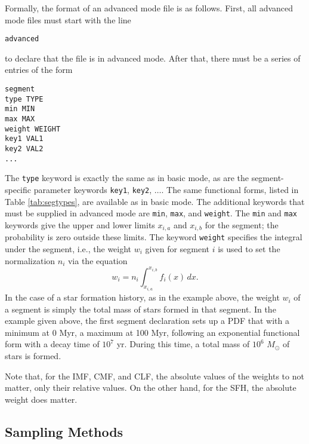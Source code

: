 \documentclass[12pt]{article}
\begin{document}
Formally, the format of an advanced mode file is as follows. First, all advanced mode files must start with the line
\begin{verbatim}
advanced
\end{verbatim}
to declare that the file is in advanced mode. After that, there must be a series of entries of the form
\begin{verbatim}
segment
type TYPE
min MIN
max MAX
weight WEIGHT
key1 VAL1
key2 VAL2
...
\end{verbatim}
The \verb=type= keyword is exactly the same as in basic mode, as are the segment-specific parameter keywords \verb=key1=, \verb=key2=, $\ldots$. The same functional forms, listed in Table \ref{tab:segtypes}, are available as in basic mode. The additional keywords that must be supplied in advanced mode are \verb=min=, \verb=max=, and \verb=weight=. The \verb=min= and \verb=max= keywords give the upper and lower limits $x_{i,a}$ and $x_{i,b}$ for the segment; the probability is zero outside these limits. The keyword \verb=weight= specifies the integral under the segment, i.e., the weight $w_i$ given for segment $i$ is used to set the normalization $n_i$ via the equation
\begin{equation}
w_i = n_i \int_{x_{i,a}}^{x_{i,b}} f_i(x) \, dx.
\end{equation}
In the case of a star formation history, as in the example above, the weight $w_i$ of a segment is simply the total mass of stars formed in that segment. In the example given above, the first segment declaration sets up a PDF that with a minimum at 0 Myr, a maximum at 100 Myr, following an exponential functional form with a decay time of $10^7$ yr. During this time, a total mass of $10^6$ $M_\odot$ of stars is formed.

Note that, for the IMF, CMF, and CLF, the absolute values of the weights to not matter, only their relative values. On the other hand, for the SFH, the absolute weight does matter.


\subsection{Sampling Methods}
\end{document}
